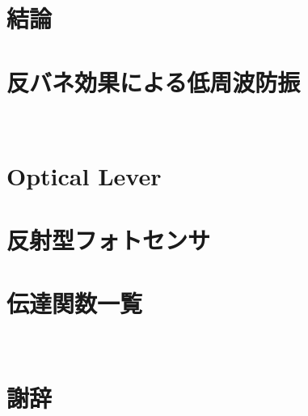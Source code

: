 \documentclass[a4j,dvipdfm]{jsreport}
\newcommand{\chaptername}{第}
\newcommand{\chapternamew}{章}
\renewcommand{\appendixname}{}
\begin{document}
\chapter{結論}
\label{第8章}
\fontsize{11pt}{16pt}\selectfont


\appendix
\def\thechapter{\Alph{chapter}}
\def\chaptername{補遺}
\def\chapternamew{}
\renewcommand{\appendixname}{補遺}
\chapter{反バネ効果による低周波防振}
\label{補遺A}
\fontsize{11pt}{16pt}\selectfont


\newpage
　
\newpage
\chapter{Optical Lever}
\label{補遺B}
\fontsize{11pt}{16pt}\selectfont


\chapter{反射型フォトセンサ}
\label{補遺C}
\fontsize{11pt}{16pt}\selectfont


\chapter{伝達関数一覧}
\label{補遺D}
\fontsize{11pt}{16pt}\selectfont


\newpage
　
\newpage
\begin{thebibliography}{99}
\fontsize{11pt}{16pt}\selectfont
\makeatletter
\@newlistfalse
\makeatother

\end{thebibliography}

\chapter*{謝辞}
\fontsize{11pt}{16pt}\selectfont

\end{document}
